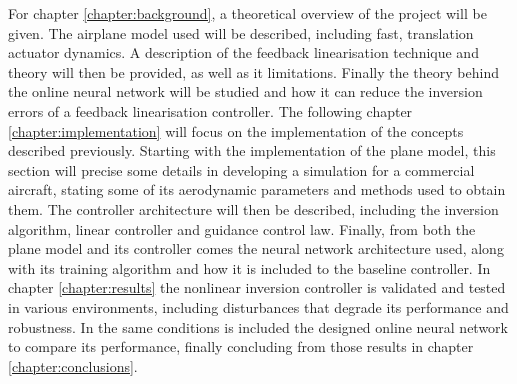 For chapter \ref{chapter:background}, a theoretical overview of the project will be given. The airplane model used will be described, including fast, translation actuator dynamics. A description of the feedback linearisation technique and theory will then be provided, as well as it limitations. Finally the theory behind the online neural network will be studied and how it can reduce the inversion errors of a feedback linearisation controller.
The following chapter \ref{chapter:implementation} will focus on the implementation of the concepts described previously. Starting with the implementation of the plane model, this section will precise some details in developing a simulation for a commercial aircraft, stating some of its aerodynamic parameters and methods used to obtain them. The controller architecture will then be described, including the inversion algorithm, linear controller and guidance control law. Finally, from both the plane model and its controller comes the neural network architecture used, along with its training algorithm and how it is included to the baseline controller. In chapter \ref{chapter:results} the nonlinear inversion controller is validated and tested in various environments, including disturbances that degrade its performance and robustness. In the same conditions is included the designed online neural network to compare its performance, finally concluding from those results in chapter \ref{chapter:conclusions}.

